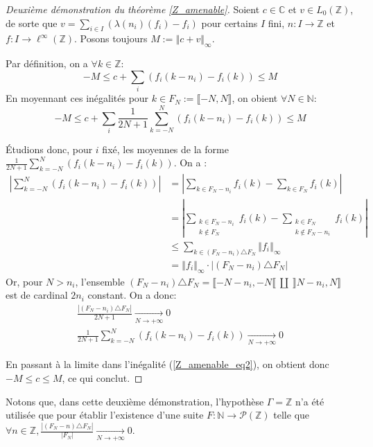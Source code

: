 \documentclass[a4paper,12pt]{article}
\newcommand{\N}{\mathbb{N}}
\newcommand{\Z}{\mathbb{Z}}
\newcommand{\C}{\mathbb{C}}
\newcommand{\norm}[1]{\left\Vert #1\right\Vert}
\newcommand{\abs}[1]{\left\vert#1\right\vert}
\newcommand{\card}[1]{\abs{#1}}
\begin{document}
\begin{proof}[Deuxième démonstration du théorème \ref{Z_amenable}]
    Soient $c\in\C$ et $v\in L_0(\Z)$, de sorte que $v = \sum_{i\in I} (\lambda(n_i)(f_i) - f_i)$ pour certains $I$ fini, $n : I \to\Z$ et
    $f : I\to\ell^\infty(\Z)$. Posons toujours $M := \norm{c + v}_\infty$.

    Par définition, on a $\forall k\in\Z$:
    \begin{equation*}
        -M \le c + \sum_i (f_i(k-n_i) - f_i(k)) \le M
    \end{equation*}
    En moyennant ces inégalités pour $k\in F_N := \llbracket-N,N\rrbracket$, on obient $\forall N\in\N$:
    \begin{equation}\label{Z_amenable_eq2}
        -M \le c + \sum_i \frac1{2N+1} \sum_{k=-N}^N (f_i(k-n_i) - f_i(k)) \le M
    \end{equation}

    Étudions donc, pour $i$ fixé, les moyennes de la forme $\frac1{2N+1} \sum_{k=-N}^N (f_i(k-n_i) - f_i(k))$. On a :
    \begin{align*}
        \abs{\sum_{k=-N}^N (f_i(k-n_i) - f_i(k))} &= \abs{\sum_{k\in F_N - n_i} f_i(k) - \sum_{k\in F_N}f_i(k)} \\
            &= \abs{\sum_{\substack{k\in F_N - n_i \\ k\notin F_N}} f_i(k) -
            \sum_{\substack{k\in F_N \\ k\notin F_N-n_i}} f_i(k)} \\
            &\le \sum_{k\in (F_N-n_i)\triangle F_N} \norm{f_i}_\infty \\
            &=\norm{f_i}_\infty \cdot \card{(F_N-n_i)\triangle F_N}
    \end{align*}
    Or, pour $N>n_i$, l'ensemble $(F_N-n_i)\triangle F_N = \llbracket -N-n_i, -N\llbracket\ \amalg\ \rrbracket N-n_i, N\rrbracket$ est de cardinal $2n_i$ constant.
    On a donc:
    \begin{gather*}
        \frac{\card{(F_N-n_i)\triangle F_N}}{2N+1} \xrightarrow[N\to+\infty]{} 0 \\
        \frac1{2N+1} \sum_{k=-N}^N (f_i(k-n_i) - f_i(k)) \xrightarrow[N\to+\infty]{} 0
    \end{gather*}

    En passant à la limite dans l'inégalité (\ref{Z_amenable_eq2}), on obtient donc $-M\le c\le M$, ce qui conclut.
\end{proof}

Notons que, dans cette deuxième démonstration, l'hypothèse $\Gamma=\Z$ n'a été utilisée que pour établir l'existence d'une suite $F:\N\to\mathcal{P}(\Z)$
telle que $\forall n\in\Z, \frac{\card{(F_N-n)\triangle F_N}}{\card{F_N}} \xrightarrow[N\to+\infty]{} 0$. 
\end{document}
